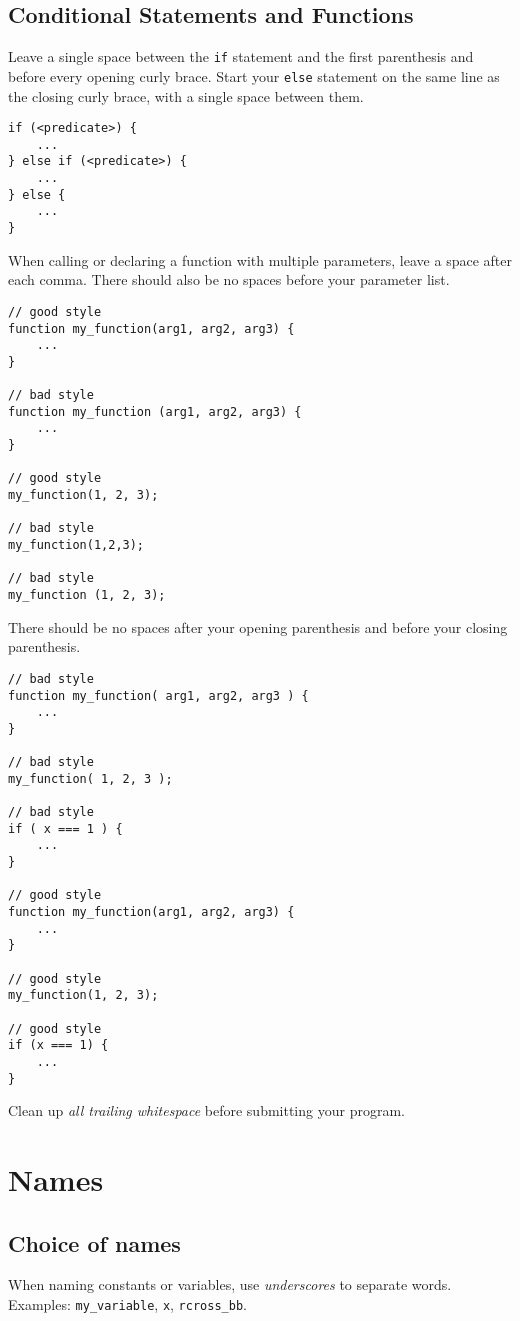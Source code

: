   \subsection*{Conditional Statements and Functions}
  Leave a single space between the \lstinline{if} statement and the first parenthesis and before every opening curly brace.
  Start your \lstinline{else} statement on the same line as the closing curly brace, with a single space between them.

\begin{lstlisting}
if (<predicate>) {
    ...
} else if (<predicate>) {
    ...
} else {
    ...
}
\end{lstlisting}

  When calling or declaring a function with multiple parameters, leave a space after each comma.
  There should also be no spaces before your parameter list.

\begin{lstlisting}
// good style
function my_function(arg1, arg2, arg3) {
    ...
}

// bad style
function my_function (arg1, arg2, arg3) {
    ...
}

// good style
my_function(1, 2, 3);

// bad style
my_function(1,2,3);

// bad style
my_function (1, 2, 3);
\end{lstlisting}

  There should be no spaces after your opening parenthesis and before your closing parenthesis.
  
\begin{lstlisting}
// bad style
function my_function( arg1, arg2, arg3 ) {
    ...
}

// bad style
my_function( 1, 2, 3 );

// bad style
if ( x === 1 ) {
    ...
}

// good style
function my_function(arg1, arg2, arg3) {
    ...
}

// good style
my_function(1, 2, 3);

// good style
if (x === 1) {
    ...
}
\end{lstlisting}

  Clean up \emph{all trailing whitespace} before submitting your program.

\section*{Names}
\subsection*{Choice of names}
When naming constants or variables,
use \emph{underscores} to separate words.
Examples: \lstinline{my_variable}, \lstinline{x}, \lstinline{rcross_bb}.

